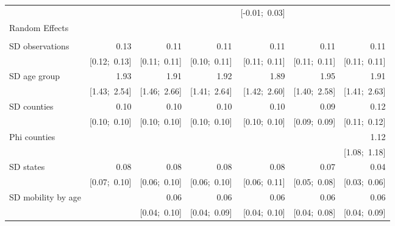 \begin{sidewaystable}[htp]
\begin{center}
{\begin{tabular}{l D{.}{.}{6.11} D{.}{.}{6.11} D{.}{.}{6.11} D{.}{.}{6.11} D{.}{.}{6.11} D{.}{.}{6.11} }
                               &                 &                 &                 & [-0.01;\ 0.03]  &                 &                 \\
Random Effects                 &                 &                 &                 &                 &                 &                 \\
                               &                 &                 &                 &                 &                 &                 \\
\quad SD observations          & 0.13            & 0.11            & 0.11            & 0.11            & 0.11            & 0.11            \\
                               & [0.12;\ 0.13]   & [0.11;\ 0.11]   & [0.10;\ 0.11]   & [0.11;\ 0.11]   & [0.11;\ 0.11]   & [0.11;\ 0.11]   \\
\quad SD age group             & 1.93            & 1.91            & 1.92            & 1.89            & 1.95            & 1.91            \\
                               & [1.43;\ 2.54]   & [1.46;\ 2.66]   & [1.41;\ 2.64]   & [1.42;\ 2.60]   & [1.40;\ 2.58]   & [1.41;\ 2.63]   \\
\quad SD counties              & 0.10            & 0.10            & 0.10            & 0.10            & 0.09            & 0.12            \\
                               & [0.10;\ 0.10]   & [0.10;\ 0.10]   & [0.10;\ 0.10]   & [0.10;\ 0.10]   & [0.09;\ 0.09]   & [0.11;\ 0.12]   \\
\quad Phi counties             &                 &                 &                 &                 &                 & 1.12            \\
                               &                 &                 &                 &                 &                 & [1.08;\ 1.18]   \\
\quad SD states                & 0.08            & 0.08            & 0.08            & 0.08            & 0.07            & 0.04            \\
                               & [0.07;\ 0.10]   & [0.06;\ 0.10]   & [0.06;\ 0.10]   & [0.06;\ 0.11]   & [0.05;\ 0.08]   & [0.03;\ 0.06]   \\
\quad SD mobility by age       &                 & 0.06            & 0.06            & 0.06            & 0.06            & 0.06            \\
                               &                 & [0.04;\ 0.10]   & [0.04;\ 0.09]   & [0.04;\ 0.10]   & [0.04;\ 0.08]   & [0.04;\ 0.09]   \\

\end{tabular}}
\end{center}
\end{sidewaystable}
